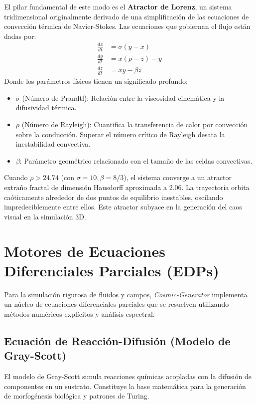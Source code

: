 \documentclass[12pt, openany]{book}
\begin{document}
El pilar fundamental de este modo es el \textbf{Atractor de Lorenz}, un sistema tridimensional originalmente derivado de una simplificación de las ecuaciones de convección térmica de Navier-Stokes. Las ecuaciones que gobiernan el flujo están dadas por:
\begin{align}
    \frac{dx}{dt} &= \sigma (y - x) \\
    \frac{dy}{dt} &= x (\rho - z) - y \\
    \frac{dz}{dt} &= x y - \beta z
\end{align}
Donde los parámetros físicos tienen un significado profundo:
\begin{itemize}
    \item $\sigma$ (Número de Prandtl): Relación entre la viscosidad cinemática y la difusividad térmica.
    \item $\rho$ (Número de Rayleigh): Cuantifica la transferencia de calor por convección sobre la conducción. Superar el número crítico de Rayleigh desata la inestabilidad convectiva.
    \item $\beta$: Parámetro geométrico relacionado con el tamaño de las celdas convectivas.
\end{itemize}
Cuando $\rho > 24.74$ (con $\sigma = 10, \beta = 8/3$), el sistema converge a un atractor extraño fractal de dimensión Hausdorff aproximada a 2.06. La trayectoria orbita caóticamente alrededor de dos puntos de equilibrio inestables, oscilando impredeciblemente entre ellos. Este atractor subyace en la generación del caos visual en la simulación 3D.

\section{Motores de Ecuaciones Diferenciales Parciales (EDPs)}

Para la simulación rigurosa de fluidos y campos, \textit{Cosmic-Generator} implementa un núcleo de ecuaciones diferenciales parciales que se resuelven utilizando métodos numéricos explícitos y análisis espectral.

\subsection{Ecuación de Reacción-Difusión (Modelo de Gray-Scott)}

El modelo de Gray-Scott simula reacciones químicas acopladas con la difusión de componentes en un sustrato. Constituye la base matemática para la generación de morfogénesis biológica y patrones de Turing.
\end{document}
